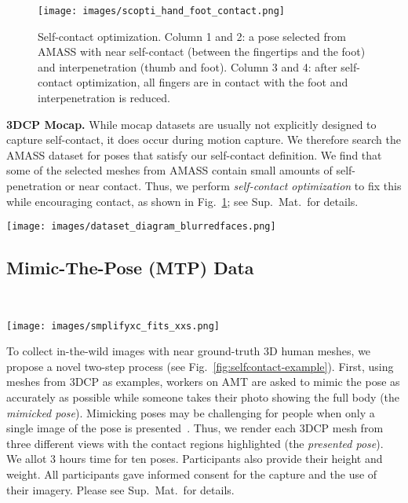 \documentclass[final]{cvpr}
\newcommand{\suppmat}{Sup.~Mat.\xspace}
\newcommand{\mtp}{\mbox{MTP}\xspace}
\newcommand{\smplifyxmc}{\mbox{SMPLify-XMC}\xspace}
\theoremstyle{definition}
\begin{document}
\begin{figure}[t!]
\centerline{
		\texttt{[image: images/scopti\_hand\_foot\_contact.png]}
}
	\caption{Self-contact optimization. Column 1 and 2: a pose selected from AMASS with near self-contact (between the fingertips and the foot) and interpenetration (thumb and foot). Column 3 and 4: after self-contact optimization, all fingers are in contact with the foot and interpenetration is reduced. }
	\label{fig:BeforeAfterSelfContactOptimization}
\end{figure}

\textbf{3DCP Mocap.}
While mocap datasets are usually not explicitly designed to capture self-contact,
it does occur during motion capture. 
We therefore search the AMASS dataset for poses that satisfy our self-contact definition.
We find that some of the selected meshes from AMASS contain small amounts of self-penetration or near contact.
Thus, we perform \emph{self-contact optimization} to fix this while encouraging contact, as shown in Fig.~\ref{fig:BeforeAfterSelfContactOptimization}; see {\suppmat}~for details.

\begin{figure*}[t]
	\texttt{[image: images/dataset\_diagram\_blurredfaces.png]}
	\caption{Mimic-The-Pose (MTP) dataset. MTP is built via: (1) collecting many 3D meshes that exhibit self-contact. In grey, new 3D scans in self-contact poses, in brown self-contact poses optimized from AMASS mocap data.  (2) collecting images in the wild, by asking workers on AMT to mimic poses and contacts.  (3) the presented meshes are refined via \smplifyxmc to match the image features.}
	\label{fig:selfcontact-example}
\end{figure*}

\subsection{Mimic-The-Pose (MTP) Data}~\label{subsection-mtp}
\begin{figure*}[t]
\centerline{		\texttt{[image: images/smplifyxc\_fits\_xxs.png]}}
\vspace{-0.02in}
	\caption{\mtp results. Meshes presented to AMT workers (blue) and the images they submitted with OpenPose keypoints overlaid. In grey, the pseudo ground-truth meshes computed by \smplifyxmc.}
	\label{fig:smplifyxcfits}
\end{figure*}
To collect in-the-wild images with near ground-truth 3D human meshes,  we propose a novel two-step process (see Fig.~\ref{fig:selfcontact-example}). 
First, using meshes from 3DCP as examples, workers on AMT are asked to mimic the pose as accurately as possible while someone takes their photo showing the full body (the \emph{mimicked pose}).
Mimicking poses may be challenging for people when only a single image of the pose is presented~\cite{marinoiu2013pictorial}. 
Thus, we render each 3DCP mesh from three different views with the contact regions highlighted (the \emph{presented pose}).
We allot 3 hours time for ten poses. Participants also provide their height and weight.
All participants gave informed consent for the capture and the use of their imagery.
Please see {\suppmat}~for details.
\end{document}
